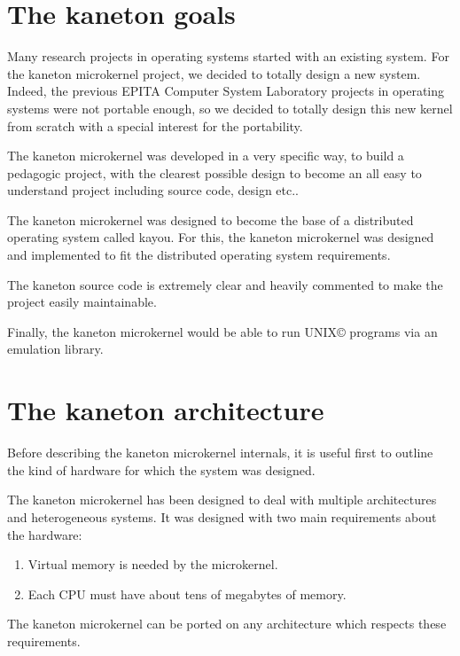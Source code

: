 \begin{multicols}{2}
%
%

\section{The kaneton goals}

Many research projects in operating systems started with an existing system.
For the kaneton microkernel project, we decided to totally design a
new system. Indeed, the previous EPITA Computer System Laboratory projects in
operating systems were not portable enough, so we decided to totally design
this new kernel from scratch with a special interest for the portability.

The kaneton microkernel was developed in a very specific way, to build
a pedagogic project, with the clearest possible design to become an
all easy to understand project including source code, design etc..

The kaneton microkernel was designed to become the base of a distributed
operating system called kayou. For this, the kaneton microkernel was designed
and implemented to fit the distributed operating system requirements.

The kaneton source code is extremely clear and heavily commented to make the
project easily maintainable.

Finally, the kaneton microkernel would be able to run
UNIX{\scriptsize \copyright} programs via an emulation library.

%
%

\section{The kaneton architecture}

Before describing the kaneton microkernel internals, it is useful first to
outline the kind of hardware for which the system was designed.

The kaneton microkernel has been designed to deal with multiple architectures
and heterogeneous systems. It was designed with two main requirements about the
hardware:

\begin{enumerate}
  \item
    Virtual memory is needed by the microkernel.
  \item
    Each CPU must have about tens of megabytes of memory.
\end{enumerate}

The kaneton microkernel can be ported on any architecture which respects these
requirements.


\end{multicols}
